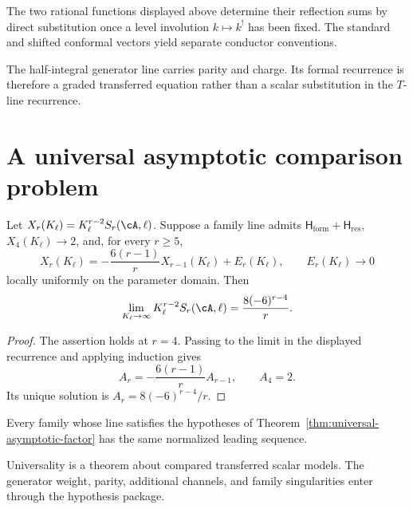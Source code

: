 \begin{corollary}
\label{cor:bp-tline-koszul-conductor}
\ClaimStatusProvedHere
The two rational functions displayed above determine their reflection
sums by direct substitution once a level involution \(k\mapsto k^{!}\)
has been fixed.  The standard and shifted conformal vectors yield
separate conductor conventions.
\end{corollary}

\begin{remark}
\label{rem:bp-gpm-graded-riccati}
The half-integral generator line carries parity and charge.  Its formal
recurrence is therefore a graded transferred equation rather than a
scalar substitution in the \(T\)-line recurrence.
\end{remark}

\section{A universal asymptotic comparison problem}
\label{sec:universal-asymptotic-factor}

\begin{theorem}
\label{thm:universal-asymptotic-factor}
\ClaimStatusConditional
Let \(X_r(K_\ell)=K_\ell^{r-2}S_r(\cA,\ell)\).  Suppose a family line admits
$\mathsf H_{\mathrm{form}}+\mathsf H_{\mathrm{res}}$,
\(X_4(K_\ell)\to2\), and, for every \(r\ge5\),
\[
 X_r(K_\ell)=-\frac{6(r-1)}rX_{r-1}(K_\ell)+E_r(K_\ell),
 \qquad E_r(K_\ell)\longrightarrow0
\]
locally uniformly on the parameter domain.  Then
\[
 \lim_{K_\ell\to\infty}K_\ell^{r-2}S_r(\cA,\ell)
 =\frac{8(-6)^{r-4}}r.
\]
\end{theorem}

\begin{proof}
The assertion holds at \(r=4\).  Passing to the limit in the displayed
recurrence and applying induction gives
\[
 A_r=-\frac{6(r-1)}rA_{r-1},\qquad A_4=2.
\]
Its unique solution is \(A_r=8(-6)^{r-4}/r\).
\end{proof}

\begin{corollary}
\label{cor:universal-asymptotic-factor}
\ClaimStatusConditional
Every family whose line satisfies the hypotheses of
Theorem~\ref{thm:universal-asymptotic-factor} has the same normalized
leading sequence.
\end{corollary}

\begin{remark}
\label{rem:class-m-asymptotic-universality}
Universality is a theorem about compared transferred scalar models.
The generator weight, parity, additional channels, and family
singularities enter through the hypothesis package.
\end{remark}

